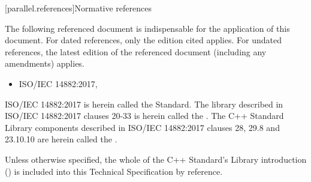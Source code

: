 
[parallel.references]{Normative references}

\pnum
The following referenced document is indispensable for the
application of this document. For dated references, only the
edition cited applies. For undated references, the latest edition
of the referenced document (including any amendments) applies.

\begin{itemize}
\item ISO/IEC 14882:2017,
\end{itemize}

\pnum
ISO/IEC 14882:2017 is herein called the \Cpp Standard.
The library described in ISO/IEC 14882:2017 clauses 20-33 is herein called the .
The C++ Standard Library components described in ISO/IEC 14882:2017 clauses 28, 29.8 and 23.10.10 are herein called the .

\pnum
Unless otherwise specified, the whole of the C++ Standard's Library introduction () is included into this Technical Specification by reference.
